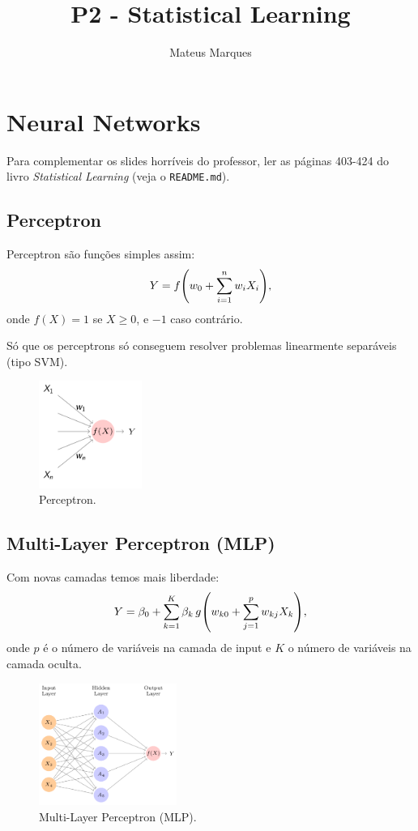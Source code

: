 \documentclass[a4paper,fleqn,12pt]{article}
\title{\Huge{\textbf{P2 - Statistical Learning}}}
\author{Mateus Marques}
\begin{document}
\maketitle

\section{Neural Networks}

Para complementar os slides horríveis do professor, ler as páginas 403-424 do livro \textit{Statistical Learning} (veja o \texttt{README.md}).

\subsection{Perceptron}

Perceptron são funções simples assim:
$$
Y = f\qty(w_0 + \sum_{i=1}^{n} w_i X_i),
$$
onde $f(X) = 1$ se $X \geq 0$, e $-1$ caso contrário.

Só que os perceptrons só conseguem resolver problemas linearmente separáveis (tipo SVM).
\begin{figure}[H]
\centering
\includegraphics[width=0.3\textwidth]{fig/perceptron.png}
\caption{Perceptron.}
\label{fig:perceptron}
\end{figure}

\subsection{Multi-Layer Perceptron (MLP)}

Com novas camadas temos mais liberdade:
$$
Y =  \beta_0 + \sum_{k=1}^{K} \beta_k \, g\qty(w_{k0} + \sum_{j=1}^{p} w_{kj} X_k),
$$
onde $p$ é o número de variáveis na camada de input e $K$ o número de variáveis na camada oculta.
\begin{figure}[H]
\centering
\includegraphics[width=0.4\textwidth]{fig/mlp.png}
\caption{Multi-Layer Perceptron (MLP).}
\label{fig:mlp}
\end{figure}
\end{document}
